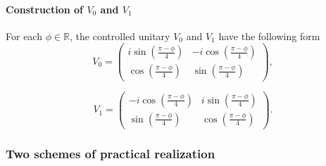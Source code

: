 \documentclass[preprint,12pt, a4paper]{elsarticle}
\newcommand{\1}{{\rm 1\hspace{-0.9mm}l}}
\begin{document}



\paragraph{Construction of $V_0$ and $V_1$}
	For each $\phi \in \mathbb{R}$,  the controlled unitary $V_0$ and $V_1$ 
	have the following form
	\begin{equation}
	V_0 = \left(\begin{array}{cc}i \sin\left( \frac{\pi - \phi}{4} \right)&-i 
	\cos\left( \frac{\pi - \phi}{4} \right)\\ \cos\left( \frac{\pi - 
	\phi}{4}\right)& \sin\left( \frac{\pi - \phi}{4} \right)\end{array}\right),
	\end{equation}
	
		\begin{equation}
	V_1 = \left(\begin{array}{cc}-i \cos\left(\frac{\pi - \phi}{4}\right) &i 
	\sin\left( \frac{\pi - \phi}{4}\right)\\\sin\left( \frac{\pi - \phi}{4} 
	\right) &  \cos\left( \frac{\pi - \phi}{4} \right) \end{array}\right).
	\end{equation}


\subsubsection{Two schemes of practical realization}
\end{document}
